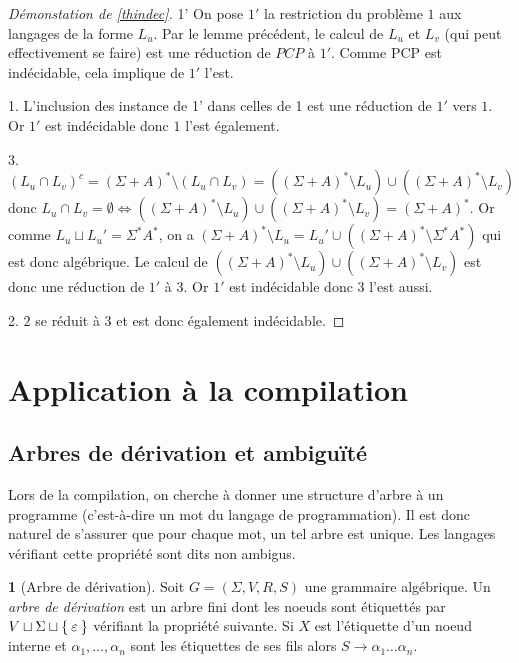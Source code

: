 \documentclass[11pt,a4paper]{article}
\theoremstyle{plain}
\theoremstyle{definition}
\newtheorem{defn}[thm]{\protect\definitionname}
\theoremstyle{definition}
\theoremstyle{remark}
\theoremstyle{remark}
\theoremstyle{plain}
\theoremstyle{plain}
\theoremstyle{plain}
\theoremstyle{remark}
\providecommand{\definitionname}{Définition}
\begin{document}
\begin{proof}[Démonstation de \ref{thindec}]
	\item[1'] On pose $1'$ la restriction du problème $1$ aux langages de la forme $L_u$. Par le lemme précédent, le calcul de $L_u$ et $L_v$ (qui peut effectivement se faire) est une réduction de $PCP$ à $1'$. Comme PCP est indécidable, cela implique de $1'$ l'est.
	
	\item[1.] L'inclusion des instance de 1' dans celles de 1 est une réduction de $1'$ vers $1$. Or $1'$ est indécidable donc $1$ l'est également.
	
	\item[3.] $(L_u\cap L_v)^c=(\Sigma+A)^*\setminus (L_u\cap L_v)=((\Sigma+A)^*\setminus L_u)\cup((\Sigma+A)^*\setminus  L_v)$ donc $L_u\cap L_v=\emptyset \iff ((\Sigma+A)^*\setminus L_u)\cup((\Sigma+A)^*\setminus  L_v)=(\Sigma+A)^*$. Or comme $L_u\sqcup L_u'=\Sigma^*A^*$, on a $(\Sigma+A)^*\setminus L_u=L_u'\cup ((\Sigma+A)^*\setminus \Sigma^*A^*)$ qui est donc algébrique. Le calcul de $((\Sigma+A)^*\setminus L_u)\cup((\Sigma+A)^*\setminus  L_v)$ est donc une réduction de $1'$ à $3$. Or $1'$ est indécidable donc $3$ l'est aussi.
	
	\item[2.] $2$ se réduit à $3$ et est donc également indécidable.
\end{proof}

\section{Application à la compilation}

\subsection{Arbres de dérivation et ambiguïté} %

Lors de la compilation, on cherche à donner une structure d'arbre à un programme (c'est-à-dire un mot du langage de programmation). Il est donc naturel de s'assurer que pour chaque mot, un tel arbre est unique. Les langages vérifiant cette propriété sont dits non ambigus.

\begin{defn}[Arbre de dérivation]
	Soit $G=(\Sigma,V,R,S)$ une grammaire algébrique. Un \emph{arbre de dérivation} est un arbre fini dont les noeuds sont étiquettés par $V\sqcup \Sigma \sqcup \Set{\varepsilon}$ vérifiant la propriété suivante. Si $X$ est l'étiquette d'un noeud interne et $\alpha_1,\dots,\alpha_n$ sont les étiquettes de ses fils alors $S\to \alpha_1\dots\alpha_n$.
\end{defn}
\end{document}
